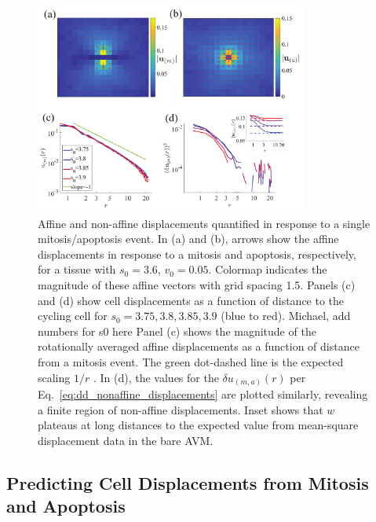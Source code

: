 \documentclass[
reprint
,aps
,amssymb
,amsmath
,superscriptaddress
]{revtex4-1}
\newcommand{\mdc}[1]{{\color{blue}#1}}
\newcommand{\lisa}[1]{{\color{red}#1}}
\begin{document}
\begin{figure}[!t]  
\begin{center}
    \includegraphics[width=0.8\textwidth]{manuscript_images_puosi_flow_mitosis.pdf}
    \caption{\label{fig:dd_single_events} Affine and non-affine displacements quantified in response to a single mitosis/apoptosis event. In (a) and (b), arrows show the affine displacements in response to a mitosis and apoptosis, respectively, for a tissue with $s_0=3.6$, $v_0=0.05$. Colormap indicates the magnitude of these affine vectors with grid spacing 1.5. Panels (c) and (d) show cell displacements as a function of distance to the cycling cell for \mdc{ $s_0 = 3.75, 3.8, 3.85, 3.9$ (blue to red)}. \lisa{Michael, add numbers for s0 here} Panel (c) shows the magnitude of the rotationally averaged affine displacements as a function of distance from a mitosis event. The green dot-dashed line is the expected scaling  $1/r$ . In (d), the values for the $\delta u_{(m,a)}(r)$ per Eq.~\ref{eq:dd_nonaffine_displacements} are plotted similarly, revealing a finite region of  non-affine displacements. Inset shows that $w$ plateaus at long distances to the expected value from mean-square displacement data in the bare AVM.
 }
    \end{center}
\end{figure}


\subsection{Predicting Cell Displacements from Mitosis and Apoptosis}
\end{document}
